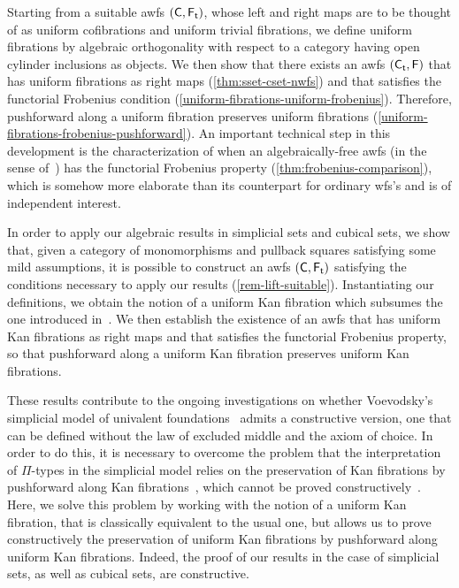 \documentclass[reqno,10pt,a4paper,oneside,draft]{amsart}
\begin{document}
Starting from a suitable awfs $(\mathsf{C}, \mathsf{F_t})$, whose left and right maps are to be thought of as uniform cofibrations and uniform trivial fibrations, we define uniform fibrations by algebraic orthogonality with respect to a category having open cylinder inclusions as objects.
We then show that there exists an awfs $(\mathsf{C_t}, \mathsf{F})$ that has uniform fibrations as right maps (\cref{thm:sset-cset-nwfs}) and that satisfies the functorial Frobenius condition (\cref{uniform-fibrations-uniform-frobenius}).
Therefore, pushforward along a uniform fibration preserves uniform fibrations (\cref{uniform-fibrations-frobenius-pushforward}).
An important technical step in this development is the characterization of when an algebraically-free awfs (in the sense of~\cite{garner:small-object-argument}) has the functorial Frobenius property (\cref{thm:frobenius-comparison}), which is somehow more elaborate than its counterpart for ordinary wfs's and is of independent interest.

In order to apply our algebraic results in simplicial sets and cubical sets, we show that, given a category of monomorphisms and pullback squares satisfying some mild assumptions, it is possible to construct an awfs $(\mathsf{C}, \mathsf{F_t})$ satisfying the conditions necessary to apply our results (\cref{rem-lift-suitable}).
Instantiating our definitions, we obtain the notion of a uniform Kan fibration which subsumes the one introduced in~\cite{cohen-et-al:cubicaltt}.
We then establish the existence of an awfs that has uniform Kan fibrations as right maps and that satisfies the functorial Frobenius property, so that pushforward along a uniform Kan fibration preserves uniform Kan fibrations.


These results contribute to the ongoing investigations on whether Voevodsky's simplicial model of univalent foundations~\cite{voevodsky-simplicial-model} admits a constructive version, \ie one that can be defined without the law of excluded middle and the axiom of choice. In order to do this, it is necessary to overcome the problem that the interpretation of
$\Pi$-types in the simplicial model relies on the preservation of Kan fibrations by pushforward along Kan fibrations~\cite[Lemma~2.3.1]{voevodsky-simplicial-model}, which cannot be proved constructively~\cite[Section~6]{coquand-non-constructivity-kan}. Here, we solve this problem by working with the notion of a uniform Kan fibration, that is classically equivalent to the usual one, but allows us to prove constructively the preservation of uniform Kan fibrations by pushforward along uniform Kan fibrations. Indeed, the proof of our results in  the case of simplicial sets, as well as cubical sets, are constructive.
\end{document}
